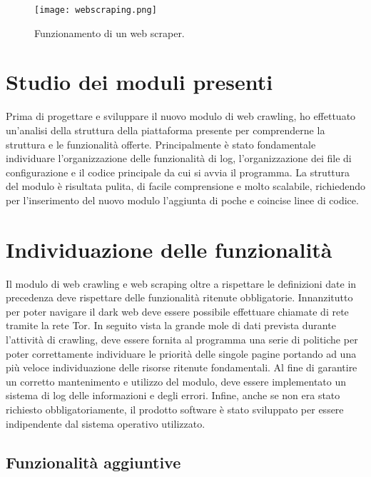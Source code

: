 \begin{figure}[!h] 
    \centering 
    \texttt{[image: webscraping.png]} 
    \caption{Funzionamento di un web scraper.}
\end{figure}


\section{Studio dei moduli presenti}

Prima di progettare e sviluppare il nuovo modulo di web crawling, ho effettuato un’analisi della struttura della piattaforma presente per comprenderne la struttura e le funzionalità offerte. Principalmente è stato fondamentale individuare l'organizzazione delle funzionalità di log, l'organizzazione dei file di configurazione e il codice principale da cui si avvia il programma. La struttura del modulo è risultata pulita, di facile comprensione e molto scalabile, richiedendo per l'inserimento del nuovo modulo l'aggiunta di poche e coincise linee di codice.


\section{Individuazione delle funzionalità}

Il modulo di web crawling e web scraping oltre a rispettare le definizioni date in precedenza deve rispettare delle funzionalità ritenute obbligatorie. Innanzitutto per poter navigare il dark web deve essere possibile effettuare chiamate di rete tramite la rete Tor. In seguito vista la grande mole di dati prevista durante l'attività di crawling, deve essere fornita al programma una serie di politiche per poter correttamente individuare le priorità delle singole pagine portando ad una più veloce individuazione delle risorse ritenute fondamentali. Al fine di garantire un corretto mantenimento e utilizzo del modulo, deve essere implementato un sistema di log delle informazioni e degli errori. Infine, anche se non era stato richiesto obbligatoriamente, il prodotto software è stato sviluppato per essere indipendente dal sistema operativo utilizzato.


\subsection{Funzionalità aggiuntive}

